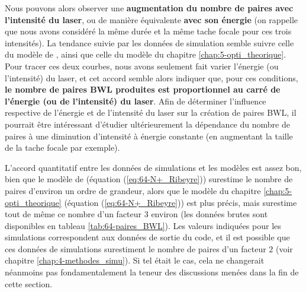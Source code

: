 \begin{refsection}
Nous pouvons alors observer une \textbf{augmentation du nombre de paires avec l'intensité du laser}, ou de manière équivalente \textbf{avec son énergie} (on rappelle que nous avons considéré la même durée et la même tache focale pour ces trois intensités). La tendance suivie par les données de simulation semble suivre celle du modèle de \cite{ribeyre_2016}, ainsi que celle du modèle du chapitre \ref{chap:5-opti_theorique}. Pour tracer ces deux courbes, nous avons seulement fait varier l'énergie (ou l'intensité) du laser, et cet accord semble alors indiquer que, pour ces conditions, \textbf{le nombre de paires BWL produites est proportionnel au carré de l'énergie (ou de l'intensité) du laser}. Afin de déterminer l'influence respective de l'énergie et de l'intensité du laser sur la création de paires BWL, il pourrait être intéressant d'étudier ultérieurement la dépendance du nombre de paires à une diminution d'intensité à énergie constante (en augmentant la taille de la tache focale par exemple).

L'accord quantitatif entre les données de simulations et les modèles est assez bon, bien que le modèle de \cite{ribeyre_2016} (équation (\ref{eq:64-N+_Ribeyre})) surestime le nombre de paires d'environ un ordre de grandeur, alors que le modèle du chapitre \ref{chap:5-opti_theorique} (équation (\ref{eq:64-N+_Ribeyre})) est plus précis, mais surestime tout de même ce nombre d'un facteur 3 environ (les données brutes sont disponibles en tableau \ref{tab:64-paires_BWL}). Les valeurs indiquées pour les simulations correspondent aux données de sortie du code, et il est possible que ces données de simulations surestiment le nombre de paires d'un facteur $2$ (voir chapitre \ref{chap:4-methodes_simu}). Si tel était le cas, cela ne changerait néanmoins pas fondamentalement la teneur des discussions menées dans la fin de cette section.


\end{refsection}

